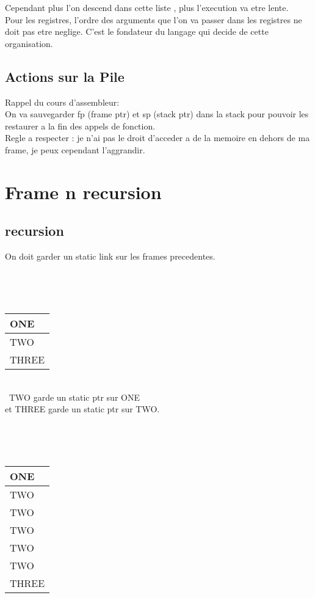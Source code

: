 \documentclass[a4paper,11pt]{article}
\begin{document}
Cependant plus l'on descend dans cette liste , plus l'execution va etre lente.\\

Pour les registres, l'ordre des arguments que l'on va passer dans les registres ne doit pas etre neglige. C'est le fondateur du langage qui decide de cette organisation.\\

\subsection{Actions sur la Pile}
Rappel du cours d'assembleur:\\
On va sauvegarder fp (frame ptr) et sp (stack ptr) dans la stack pour pouvoir les restaurer a la fin des appels de fonction.\\
Regle a respecter : je n'ai pas le droit d'acceder a de la memoire en dehors de ma frame, je peux cependant l'aggrandir.\\

\section{Frame n recursion}

\subsection{recursion}
On doit garder un static link sur les frames precedentes.

\

\
\begin{tabular}{|l|}
\hline
ONE   \\ \hline
TWO   \\ \hline
THREE \\ \hline
\end{tabular}
\\

\
TWO garde un static ptr sur ONE\\et THREE garde un static ptr sur TWO.

\

\
\begin{tabular}{|l|}
\hline
ONE   \\ \hline
TWO   \\ \hline
TWO   \\ \hline
TWO   \\ \hline
TWO   \\ \hline
TWO   \\ \hline
THREE \\ \hline
\end{tabular}
\\
\end{document}
